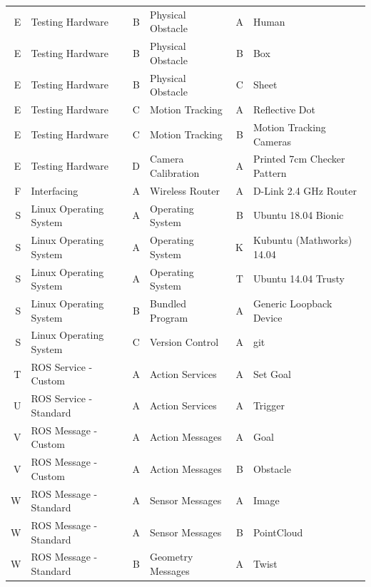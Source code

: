 \documentclass{article}
\begin{document}
\begin{table}
\begin{tabular}{|rl|rl|rl|}
			E & Testing Hardware       & B & Physical Obstacle  & A   & Human                             \\
			E & Testing Hardware       & B & Physical Obstacle  & B   & Box                               \\
			E & Testing Hardware       & B & Physical Obstacle  & C   & Sheet                             \\
			E & Testing Hardware       & C & Motion Tracking    & A   & Reflective Dot                    \\
			E & Testing Hardware       & C & Motion Tracking    & B   & Motion Tracking Cameras           \\
			E & Testing Hardware       & D & Camera Calibration & A   & Printed 7cm Checker Pattern       \\ \hline
			F & Interfacing            & A & Wireless Router    & A   & D-Link 2.4 GHz Router             \\ \hline
			S & Linux Operating System & A & Operating System   & B   & Ubuntu 18.04 Bionic               \\
			S & Linux Operating System & A & Operating System   & K   & Kubuntu (Mathworks) 14.04         \\
			S & Linux Operating System & A & Operating System   & T   & Ubuntu 14.04 Trusty               \\
			S & Linux Operating System & B & Bundled Program    & A   & Generic Loopback Device           \\
			S & Linux Operating System & C & Version Control    & A   & git                               \\ \hline
			T & ROS Service - Custom   & A & Action Services    & A   & Set Goal                          \\ \hline
			U & ROS Service - Standard & A & Action Services    & A   & Trigger                           \\ \hline
			V & ROS Message - Custom   & A & Action Messages    & A   & Goal                              \\
			V & ROS Message - Custom   & A & Action Messages    & B   & Obstacle                          \\ \hline
			W & ROS Message - Standard & A & Sensor Messages    & A   & Image                             \\
			W & ROS Message - Standard & A & Sensor Messages    & B   & PointCloud                        \\
			W & ROS Message - Standard & B & Geometry Messages  & A   & Twist                             \\

\end{tabular}
\end{table}
\end{document}
